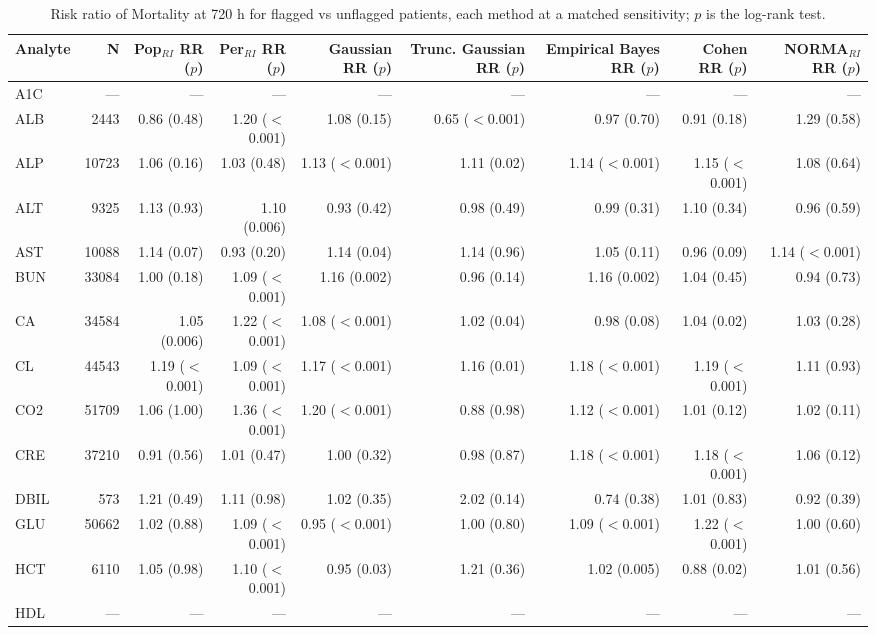 \begin{table}[ht]
\centering
\footnotesize
\caption{Risk ratio of Mortality at 720 h for flagged vs unflagged patients, each method at a matched sensitivity; $p$ is the log-rank test.}
\begin{tabular}{lrrrrrrrr}
\toprule
Analyte & N & Pop$_{RI}$ RR ($p$) & Per$_{RI}$ RR ($p$) & Gaussian RR ($p$) & Trunc. Gaussian RR ($p$) & Empirical Bayes RR ($p$) & Cohen RR ($p$) & NORMA$_{RI}$ RR ($p$) \\
\midrule
A1C & --- & --- & --- & --- & --- & --- & --- & --- \\
ALB & 2443 & 0.86 (0.48) & 1.20 ($<$0.001) & 1.08 (0.15) & 0.65 ($<$0.001) & 0.97 (0.70) & 0.91 (0.18) & 1.29 (0.58) \\
ALP & 10723 & 1.06 (0.16) & 1.03 (0.48) & 1.13 ($<$0.001) & 1.11 (0.02) & 1.14 ($<$0.001) & 1.15 ($<$0.001) & 1.08 (0.64) \\
ALT & 9325 & 1.13 (0.93) & 1.10 (0.006) & 0.93 (0.42) & 0.98 (0.49) & 0.99 (0.31) & 1.10 (0.34) & 0.96 (0.59) \\
AST & 10088 & 1.14 (0.07) & 0.93 (0.20) & 1.14 (0.04) & 1.14 (0.96) & 1.05 (0.11) & 0.96 (0.09) & 1.14 ($<$0.001) \\
BUN & 33084 & 1.00 (0.18) & 1.09 ($<$0.001) & 1.16 (0.002) & 0.96 (0.14) & 1.16 (0.002) & 1.04 (0.45) & 0.94 (0.73) \\
CA & 34584 & 1.05 (0.006) & 1.22 ($<$0.001) & 1.08 ($<$0.001) & 1.02 (0.04) & 0.98 (0.08) & 1.04 (0.02) & 1.03 (0.28) \\
CL & 44543 & 1.19 ($<$0.001) & 1.09 ($<$0.001) & 1.17 ($<$0.001) & 1.16 (0.01) & 1.18 ($<$0.001) & 1.19 ($<$0.001) & 1.11 (0.93) \\
CO2 & 51709 & 1.06 (1.00) & 1.36 ($<$0.001) & 1.20 ($<$0.001) & 0.88 (0.98) & 1.12 ($<$0.001) & 1.01 (0.12) & 1.02 (0.11) \\
CRE & 37210 & 0.91 (0.56) & 1.01 (0.47) & 1.00 (0.32) & 0.98 (0.87) & 1.18 ($<$0.001) & 1.18 ($<$0.001) & 1.06 (0.12) \\
DBIL & 573 & 1.21 (0.49) & 1.11 (0.98) & 1.02 (0.35) & 2.02 (0.14) & 0.74 (0.38) & 1.01 (0.83) & 0.92 (0.39) \\
GLU & 50662 & 1.02 (0.88) & 1.09 ($<$0.001) & 0.95 ($<$0.001) & 1.00 (0.80) & 1.09 ($<$0.001) & 1.22 ($<$0.001) & 1.00 (0.60) \\
HCT & 6110 & 1.05 (0.98) & 1.10 ($<$0.001) & 0.95 (0.03) & 1.21 (0.36) & 1.02 (0.005) & 0.88 (0.02) & 1.01 (0.56) \\
HDL & --- & --- & --- & --- & --- & --- & --- & --- \\

\end{tabular}
\end{table}
